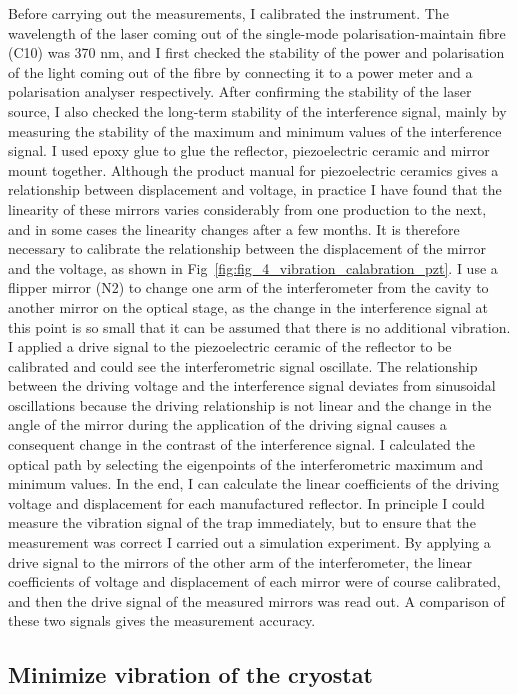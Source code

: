 Before carrying out the measurements, I calibrated the instrument. The wavelength of the laser coming out of the single-mode polarisation-maintain fibre (C10) was 370 nm, and I first checked the stability of the power and polarisation of the light coming out of the fibre by connecting it to a power meter and a polarisation analyser respectively. After confirming the stability of the laser source, I also checked the long-term stability of the interference signal, mainly by measuring the stability of the maximum and minimum values of the interference signal. I used epoxy glue to glue the reflector, piezoelectric ceramic and mirror mount together. Although the product manual for piezoelectric ceramics gives a relationship between displacement and voltage, in practice I have found that the linearity of these mirrors varies considerably from one production to the next, and in some cases the linearity changes after a few months. It is therefore necessary to calibrate the relationship between the displacement of the mirror and the voltage, as shown in Fig~\ref{fig:fig_4_vibration_calabration_pzt}. I use a flipper mirror (N2) to change one arm of the interferometer from the cavity to another mirror on the optical stage, as the change in the interference signal at this point is so small that it can be assumed that there is no additional vibration. I applied a drive signal to the piezoelectric ceramic of the reflector to be calibrated and could see the interferometric signal oscillate. The relationship between the driving voltage and the interference signal deviates from sinusoidal oscillations because the driving relationship is not linear and the change in the angle of the mirror during the application of the driving signal causes a consequent change in the contrast of the interference signal. I calculated the optical path by selecting the eigenpoints of the interferometric maximum and minimum values. In the end, I can calculate the linear coefficients of the driving voltage and displacement for each manufactured reflector. In principle I could measure the vibration signal of the trap immediately, but to ensure that the measurement was correct I carried out a simulation experiment. By applying a drive signal to the mirrors of the other arm of the interferometer, the linear coefficients of voltage and displacement of each mirror were of course calibrated, and then the drive signal of the measured mirrors was read out. A comparison of these two signals gives the measurement accuracy.

\subsection{Minimize vibration of the cryostat}

